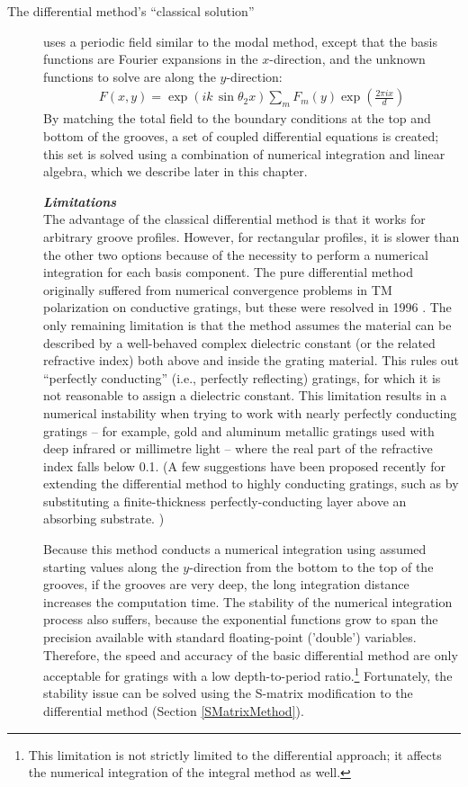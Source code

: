 \begin{description}
\item[The differential method's ``classical solution''] uses a periodic field similar to the modal method, except that the basis functions are Fourier expansions in the $x$-direction, and the unknown functions to solve are along the $y$-direction:
\begin{align}
F(x,y)=\exp\left( ik\, \sin \theta_{2}x \right) \sum\limits_m F_m(y) \exp \left( \frac{2\pi i x}{d} \right)
\end{align}
By matching the total field to the boundary conditions at the top and bottom of the grooves, a set of coupled differential equations is created; this set is solved using a combination of numerical integration and linear algebra, which we describe later in this chapter.  
 
\noindent\textbf{\emph{Limitations}}\\
The advantage of the classical differential method is that it works for arbitrary groove profiles.  However, for rectangular profiles, it is slower than the other two options because of the necessity to perform a numerical integration for each basis component.  The pure differential method originally suffered from numerical convergence problems in TM polarization on conductive gratings, but these were resolved in 1996 \cite{Li96b} \cite{Pop00}.  The only remaining limitation is that the method assumes the material can be described by a well-behaved complex dielectric constant (or the related refractive index) both above and inside the grating material.  This rules out ``perfectly conducting'' (i.e., perfectly reflecting) gratings, for which it is not reasonable to assign a dielectric constant.  This limitation results in a numerical instability when trying to work with nearly perfectly conducting gratings -- for example, gold and aluminum metallic gratings used with deep infrared or millimetre light -- where the real part of the refractive index falls below 0.1.  (A few suggestions have been proposed recently for extending the differential method to highly conducting gratings, such as by substituting a finite-thickness perfectly-conducting layer above an absorbing substrate. \cite{Pop04})
 
Because this method conducts a numerical integration using assumed starting values along the $y$-direction from the bottom to the top of the grooves, if the grooves are very deep, the long integration distance increases the computation time.  The stability of the numerical integration process also suffers, because the exponential functions grow to span the precision available with standard floating-point ('double') variables.   Therefore, the speed and accuracy of the basic differential method are only acceptable for gratings with a low depth-to-period ratio.\footnote{This limitation is not strictly limited to the differential approach; it affects the numerical integration of the integral method as well.}  Fortunately, the stability issue can be solved using the S-matrix modification to the differential method (Section \ref{SMatrixMethod}).
 

\end{description}
